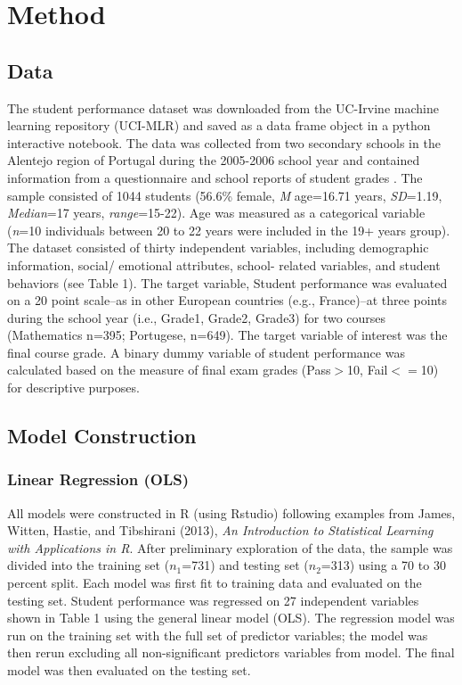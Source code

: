 \documentclass[sigconf]{acmart}
\begin{document}
\section{Method}

\subsection{Data}

The student performance dataset was downloaded from the UC-Irvine machine 
learning repository (UCI-MLR) and saved as a data frame object in a python 
interactive notebook. The data was collected from two secondary schools in 
the Alentejo region of Portugal during the 2005-2006 school year and 
contained information from a questionnaire and school reports of student 
grades \cite{cortez08}. The sample consisted of 1044 students (56.6\% female, 
\textit{M} age=16.71 years, \textit{SD}=1.19, \textit{Median}=17 years, 
\textit{range}=15-22). Age was measured as a categorical variable 
(\textit{n}=10 individuals between 20 to 22 years were included in the 19+ 
years group). The dataset consisted of thirty independent variables, 
including demographic information, social/ emotional attributes, school-
related variables, and student behaviors (see Table 1). The target variable, 
Student performance was evaluated on a 20 point scale--as in other European 
countries (e.g., France)--at three points during the school year (i.e., 
Grade1, Grade2, Grade3) for two courses (Mathematics n=395; Portugese, n=649). 
The target variable of interest was the final course grade. A binary dummy 
variable of student performance was calculated based on the measure of final 
exam grades (Pass$>$10, Fail$<=$10) for descriptive purposes.


\subsection{Model Construction}

\subsubsection{Linear Regression (OLS)} 

All models were constructed in R (using Rstudio) following examples from
James, Witten, Hastie, and Tibshirani (2013), \emph{An Introduction to 
Statistical Learning with Applications in R}\cite{jamesetal13}. After 
preliminary exploration of the data, the sample was divided into the training 
set ($n_1$=731) and testing set ($n_2$=313) using a 70 to 30 percent split. 
Each model was first fit to training data and evaluated on the testing set. 
Student performance was regressed on 27 independent variables shown in Table 1 
using the general linear model (OLS). The regression model was run on the 
training set with the full set of predictor variables; the model was then 
rerun excluding all non-significant predictors variables from model. The final 
model was then evaluated on the testing set. 
\end{document}
